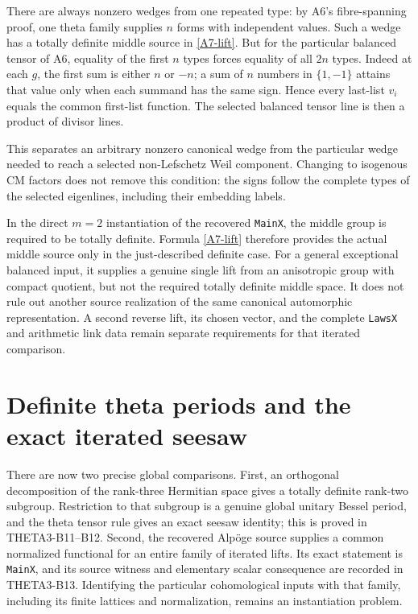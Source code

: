 \documentclass[11pt]{article}
\theoremstyle{definition}\newtheorem{definition}[theorem]{Definition}\newtheorem{remark}[theorem]{Remark}
\begin{document}
There are always nonzero wedges from one repeated type: by A6's
fibre-spanning proof, one theta family supplies $n$ forms with
independent values. Such a wedge has a totally definite middle
source in \eqref{A7-lift}. But for the particular balanced tensor
of A6, equality of the first $n$ types forces equality of all
$2n$ types. Indeed at each $g$, the first sum is either $n$ or
$-n$; a sum of $n$ numbers in $\{1,-1\}$ attains that value
only when each summand has the same sign. Hence every last-list
$v_i$ equals the common first-list function. The selected
balanced tensor line is then a product of divisor lines.

This separates an arbitrary nonzero canonical wedge from the
particular wedge needed to reach a selected non-Lefschetz
Weil component. Changing to isogenous CM factors does not
remove this condition: the signs follow the complete types of
the selected eigenlines, including their embedding labels.

In the direct $m=2$ instantiation of the recovered
\texttt{MainX}, the middle group is required to be totally
definite. Formula \eqref{A7-lift} therefore provides the actual
middle source only in the just-described definite case.
For a general exceptional balanced input, it supplies a genuine
single lift from an anisotropic group with compact quotient,
but not the required totally definite middle space. It does
not rule out another source realization of the same canonical
automorphic representation. A second reverse lift, its chosen
vector, and the complete \texttt{LawsX} and arithmetic link data
remain separate requirements for that iterated comparison.


\section{Definite theta periods and the exact iterated seesaw}

There are now two precise global comparisons. First, an orthogonal decomposition of the rank-three Hermitian space gives a totally definite rank-two subgroup. Restriction to that subgroup is a genuine global unitary Bessel period, and the theta tensor rule gives an exact seesaw identity; this is proved in THETA3-B11--B12. Second, the recovered Alp\"oge source supplies a common normalized functional for an entire family of iterated lifts. Its exact statement is \texttt{MainX}, and its source witness and elementary scalar consequence are recorded in THETA3-B13. Identifying the particular cohomological inputs with that family, including its finite lattices and normalization, remains an instantiation problem.
\end{document}
